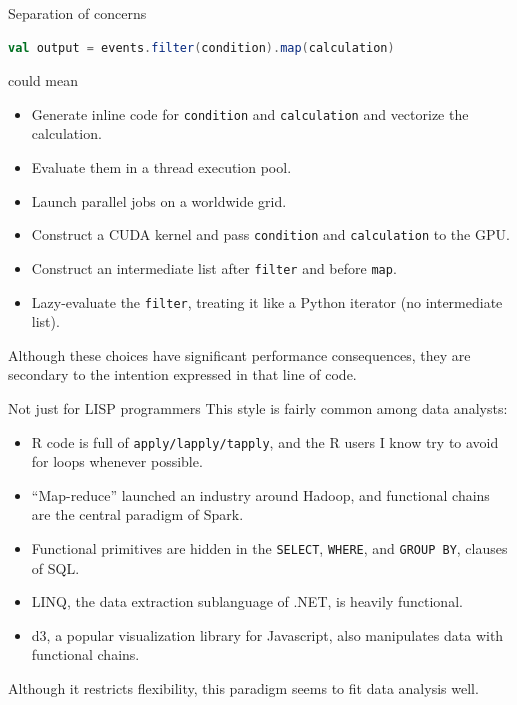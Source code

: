 \documentclass{beamer}
\begin{document}
\begin{frame}[fragile]{Separation of concerns}
\vspace{0.5 cm}
\begin{minipage}[fragile]{0.85\linewidth}
\begin{lstlisting}[language=scala, basicstyle=\ttfamily\scriptsize, frame=single]
val output = events.filter(condition).map(calculation)
\end{lstlisting}
\end{minipage}

could mean

\begin{itemize}
\item Generate inline code for {\small\tt condition} and {\small\tt calculation} and vectorize the calculation.
\item Evaluate them in a thread execution pool.
\item Launch parallel jobs on a worldwide grid.
\item Construct a CUDA kernel and pass {\small\tt condition} and {\small\tt calculation} to the GPU.
\item Construct an intermediate list after {\small\tt filter} and before {\small\tt map}.
\item Lazy-evaluate the {\small\tt filter}, treating it like a Python iterator (no intermediate list).
\end{itemize}

Although these choices have significant performance consequences, they are secondary to the intention expressed in that line of code.
\end{frame}

\begin{frame}{Not just for LISP programmers}
\vspace{0.5 cm}
This style is fairly common among data analysts:

\begin{itemize}
\item R code is full of {\small\tt apply/lapply/tapply}, and the R users I know try to avoid for loops whenever possible.
\item ``Map-reduce'' launched an industry around Hadoop, and functional chains are the central paradigm of Spark.
\item Functional primitives are hidden in the {\small\tt SELECT}, {\small\tt WHERE}, and {\small\tt GROUP BY}, clauses of SQL.
\item LINQ, the data extraction sublanguage of .NET, is heavily functional.
\item d3, a popular visualization library for Javascript, also manipulates data with functional chains.
\end{itemize}

Although it restricts flexibility, this paradigm seems to fit data analysis well.
\end{frame}
\end{document}
